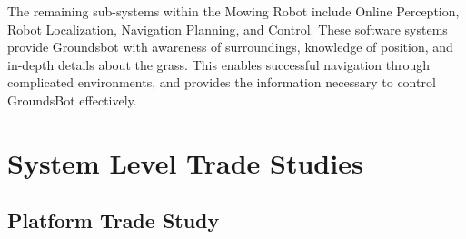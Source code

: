\documentclass{article}
\begin{document}
  The remaining sub-systems within the Mowing Robot include Online Perception, Robot Localization, Navigation Planning, and Control. These software systems provide Groundsbot with awareness of surroundings, knowledge of position, and in-depth details about the grass. This enables successful navigation through complicated environments, and provides the information necessary to control GroundsBot effectively.\\

\section{System Level Trade Studies}
	\subsection{Platform Trade Study}
	
\end{document}
